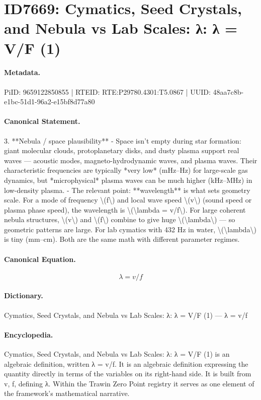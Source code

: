 \section*{ID7669: Cymatics, Seed Crystals, and Nebula vs Lab Scales: λ: λ = V/F (1)}
\paragraph{Metadata.}
PiID: 9659122850855 | RTEID: RTE:P29780.4301:T5.0867 | UUID: 48aa7c8b-e1bc-51d1-96a2-e15bf8d77a80

\paragraph{Canonical Statement.}
3. **Nebula / space plausibility** - Space isn’t empty during star formation: giant molecular clouds, protoplanetary disks, and dusty plasma support real waves — acoustic modes, magneto-hydrodynamic waves, and plasma waves. Their characteristic frequencies are typically *very low* (mHz–Hz) for large-scale gas dynamics, but *microphysical* plasma waves can be much higher (kHz–MHz) in low-density plasma. - The relevant point: **wavelength** is what sets geometry scale. For a mode of frequency \textbackslash{}(f\textbackslash{}) and local wave speed \textbackslash{}(v\textbackslash{}) (sound speed or plasma phase speed), the wavelength is \textbackslash{}(\textbackslash{}lambda = v/f\textbackslash{}). For large coherent nebula structures, \textbackslash{}(v\textbackslash{}) and \textbackslash{}(f\textbackslash{}) combine to give huge \textbackslash{}(\textbackslash{}lambda\textbackslash{}) — so geometric patterns are large. For lab cymatics with 432 Hz in water, \textbackslash{}(\textbackslash{}lambda\textbackslash{}) is tiny (mm–cm). Both are the same math with different parameter regimes.

\paragraph{Canonical Equation.}
\[
\lambda = v/f
\]

\paragraph{Dictionary.}
Cymatics, Seed Crystals, and Nebula vs Lab Scales: λ: λ = V/F (1) — λ = v/f

\paragraph{Encyclopedia.}
Cymatics, Seed Crystals, and Nebula vs Lab Scales: λ: λ = V/F (1) is an algebraic definition, written λ = v/f. It is an algebraic definition expressing the quantity directly in terms of the variables on its right-hand side. It is built from v, f, defining λ. Within the Trawin Zero Point registry it serves as one element of the framework's mathematical narrative.
